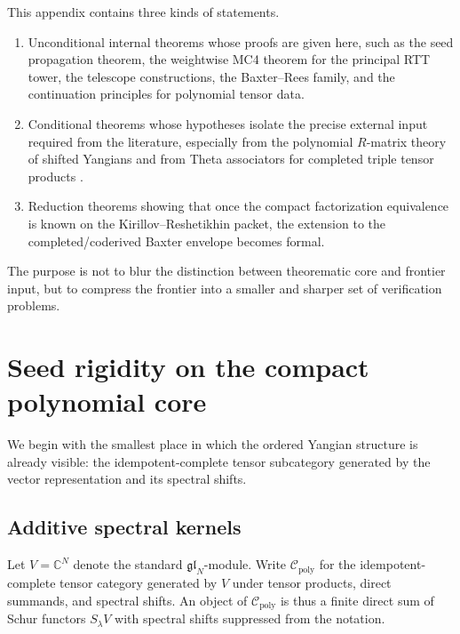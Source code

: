 \begin{remark}
\label{rem:typeA-status-scope}
This appendix contains three kinds of statements.
\begin{enumerate}
    \item Unconditional internal theorems whose proofs are given here,
    such as the seed propagation theorem, the weightwise MC4 theorem for
    the principal RTT tower, the telescope constructions, the
    Baxter--Rees family, and the continuation principles for polynomial
    tensor data.
    \item Conditional theorems whose hypotheses isolate the precise
    external input required from the literature, especially from the
    polynomial $R$-matrix theory of shifted Yangians and from Theta
    associators for completed triple tensor products
    \cite{HZ24,ZhangTheta24}.
    \item Reduction theorems showing that once the compact factorization
    equivalence is known on the Kirillov--Reshetikhin packet, the
    extension to the completed/coderived Baxter envelope becomes formal.
\end{enumerate}
The purpose is not to blur the distinction between theorematic core and
frontier input, but to compress the frontier into a smaller and sharper
set of verification problems.
\end{remark}

\section{Seed rigidity on the compact polynomial core}
\label{sec:typeA-seed-rigidity}

We begin with the smallest place in which the ordered Yangian structure
is already visible: the idempotent-complete tensor subcategory generated
by the vector representation and its spectral shifts.

\subsection{Additive spectral kernels}

Let $V=\mathbb C^N$ denote the standard $\mathfrak{gl}_N$-module.  Write
$\mathcal C_{\mathrm{poly}}$ for the idempotent-complete tensor category
generated by $V$ under tensor products, direct summands, and spectral
shifts.  An object of $\mathcal C_{\mathrm{poly}}$ is thus a finite direct
sum of Schur functors $S_\lambda V$ with spectral shifts suppressed from
the notation.

